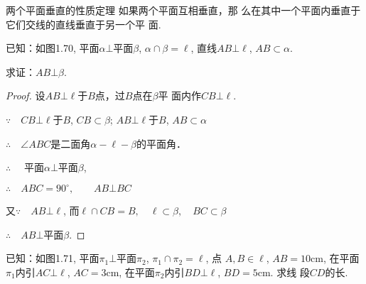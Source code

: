 \begin{blk}
  {两个平面垂直的性质定理} 如果两个平面互相垂直，那
么在其中一个平面内垂直于它们交线的直线垂直于另一个平
面. 
\end{blk}

已知：如图1.70, 平面$\alpha\bot $平面$\beta$, 
$\alpha\cap\beta =\ell$, 直线$AB\bot\ell$, $AB\subset\alpha$. 

求证：$AB\bot\beta$.

\begin{proof}
设$AB\bot\ell$于$B$点，过$B$点在$\beta$平
面内作$CB\bot\ell$.

$\because\quad CB\bot\ell$于$B$, $CB\subset \beta$; 
$AB\bot\ell$于$B$, $AB\subset\alpha$

$\therefore\quad \angle ABC$是二面角$\alpha-\ell-\beta$的平面角．

$\therefore\quad$ 平面$\alpha\bot$平面$\beta$,

$\therefore\quad ABC=90^{\circ},\qquad AB\bot BC$

又$\because\quad AB\bot \ell$, 而$\ell\cap CB=B,\quad \ell\subset \beta,\quad BC\subset \beta$

$\therefore\quad AB\bot$平面$\beta$.
\end{proof}

\begin{example}
  已知：如图1.71, 平面$\pi_1\bot $平面$\pi_2$, $\pi_1\cap \pi_2=\ell$, 点
$A,B\in \ell$, $AB=10$cm, 在平面$\pi_1$内引$AC\bot\ell$, 
$AC=3$cm, 在平面$\pi_2$内引$BD\bot\ell$, $BD=5$cm. 求线
段$CD$的长. 
\end{example}

\begin{figure}[htp]
  \centering
{}
  \caption{}
\end{figure}

